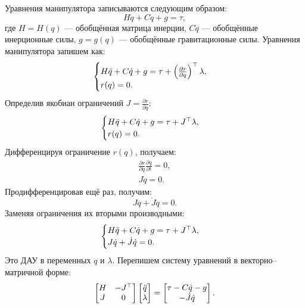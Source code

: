 Уравнения манипулятора записываются следующим образом:
%
\begin{equation}
	{H} \ddot{{q}} + {C} \dot{{q}} + {g} = \tau,
\end{equation}
%
где ${H}={H}({q})$ --- обобщённая матрица инерции, ${C}\dot{{q}}$ --- обобщённые инерционные силы, ${g}={g}({q})$ --- обобщённые гравитационные силы.
Уравнения манипулятора запишем как:
%
\begin{equation}
	\begin{cases}
		{H} \ddot{{q}} + {C} \dot{{q}} + {g} = \tau + \left( \frac{\partial {r}}{\partial {q}} \right)^\top \lambda,
		\\
		{r}({q}) = 0.
	\end{cases}
\end{equation}
%
Определив якобиан ограничений ${J} = \frac{\partial {r}}{\partial {q}}$:
%
\begin{equation}
	\begin{cases}
		{H} \ddot{{q}} + {C} \dot{{q}} + {g} = \tau + {J}^\top \lambda,
		\\
		{r}({q}) = 0.
	\end{cases}
\end{equation}
Дифференцируя ограничение ${r}({q})$, получаем:
%
\begin{align}
	\frac{\partial {r}}{\partial {q}} \frac{\partial {q}}{\partial t} = 0,\\
	{J} \dot{{q}} = 0.
\end{align}
%
Продифференцировав ещё раз, получим:
%
\begin{equation}
	{J} \ddot{{q}} + \dot{{J}} \dot{{q}} = 0.
\end{equation}
%
Заменяя ограничения их вторыми производными:
%
\begin{equation}
	\begin{cases}
		{H} \ddot{{q}} + {C} \dot{{q}} + {g} = \tau + {J}^\top \lambda,
		\\
		{J} \dot{{q}} + \dot{{J}} \dot{{q}} = 0.
	\end{cases}
\end{equation}
%
Это ДАУ в переменных ${q}$ и $\lambda$. Перепишем систему уравнений в векторно--матричной форме:
%
\begin{equation}
	\begin{bmatrix}
		{H} & -{J}^\top \\
		{J} & 0
	\end{bmatrix}
	\begin{bmatrix}
		\ddot{{q}} \\
		\lambda
	\end{bmatrix}
	=
	\begin{bmatrix}
		\tau - {C} \dot{{q}} - {g} \\
		-\dot{{J}} \dot{{q}}
	\end{bmatrix}.
\end{equation}

